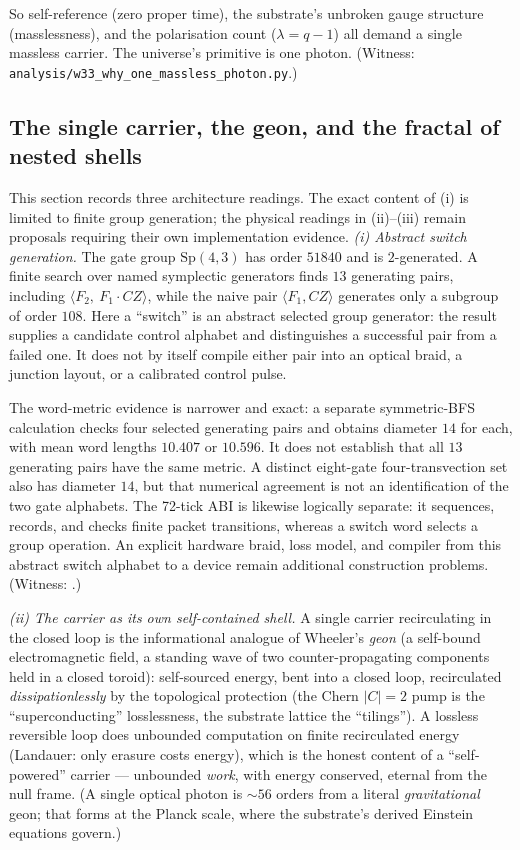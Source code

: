\documentclass[11pt]{article}
\begin{document}
So self-reference (zero proper time), the substrate's unbroken gauge structure
(masslessness), and the polarisation count ($\lambda=q-1$) all demand a single
massless carrier. The universe's primitive is one photon. (Witness:
\texttt{analysis/w33\_why\_one\_massless\_photon.py}.)

\subsection{The single carrier, the geon, and the fractal of nested shells}

This section records three architecture readings.  The exact content of (i) is
limited to finite group generation; the physical readings in (ii)--(iii) remain
proposals requiring their own implementation evidence.  \emph{(i) Abstract
switch generation.} The gate group $\mathrm{Sp}(4,3)$ has order $51840$ and is
$2$-generated.  A finite search over named symplectic generators finds $13$
generating pairs, including $\langle F_2,\ F_1\!\cdot\! CZ\rangle$, while the
naive pair $\langle F_1,CZ\rangle$ generates only a subgroup of order $108$.
Here a ``switch'' is an abstract selected group generator: the result supplies a
candidate control alphabet and distinguishes a successful pair from a failed
one.  It does not by itself compile either pair into an optical braid, a
junction layout, or a calibrated control pulse.

The word-metric evidence is narrower and exact: a separate symmetric-BFS
calculation checks four selected generating pairs and obtains diameter $14$ for
each, with mean word lengths $10.407$ or $10.596$.  It does not establish that
all $13$ generating pairs have the same metric.  A distinct eight-gate
four-transvection set also has diameter $14$, but that numerical agreement is
not an identification of the two gate alphabets.  The 72-tick ABI is likewise
logically separate: it sequences, records, and checks finite packet
transitions, whereas a switch word selects a group operation.  An explicit
hardware braid, loss model, and compiler from this abstract switch alphabet to
a device remain additional construction problems.  (Witness:
.)

\emph{(ii) The carrier as its own self-contained shell.} A single carrier
recirculating in the closed loop is the informational analogue of Wheeler's
\emph{geon} (a self-bound electromagnetic field, a standing wave of two
counter-propagating components held in a closed toroid): self-sourced energy,
bent into a closed loop, recirculated \emph{dissipationlessly} by the topological
protection (the Chern $|C|=2$ pump is the ``superconducting'' losslessness, the
substrate lattice the ``tilings''). A lossless reversible loop does unbounded
computation on finite recirculated energy (Landauer: only erasure costs energy),
which is the honest content of a ``self-powered'' carrier --- unbounded
\emph{work}, with energy conserved, eternal from the null frame. (A single
optical photon is $\sim\!56$ orders from a literal \emph{gravitational} geon;
that forms at the Planck scale, where the substrate's derived Einstein equations
govern.)
\end{document}
